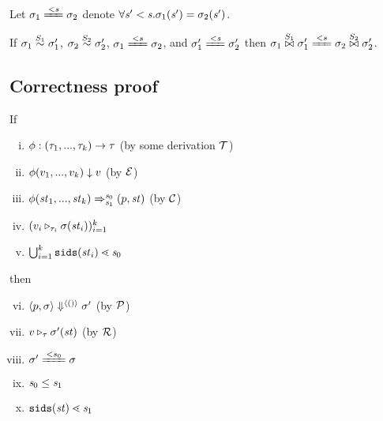 Let $\sgm_1 \ConEq{\s} \sgm_2$ denote $\forall \s' < \s. \sgm_1(\s') = \sgm_2(\s')$. 
	
\begin{lem}\label{lem-join2}
	If $\sgm_1 \~{\S_1} \sgm'_1$, $\sgm_2 \~{\S_2} \sgm'_2$, $\sgm_1 \ConEq{s} \sgm_2$,
	and $\sgm'_1 \ConEq{\s} \sgm_2'$  
	then $\sgm_1 \x{\S_1} \sgm_1' \ConEq{s} \sgm_2 \x{\S_2} \sgm'_2$. 
\end{lem}




\subsection{Correctness proof}

\begin{lem}
	\label{function-correctness}
	If 
	\begin{enumerate}[(i)]
	\item $\Typef{\hcall}{\replc{k}{\tau}}\tau$ (by some derivation $\MT$)
	\item $\EvalF{\hcall}{\replc{k}{v}}{v}$ (by $\ME$)
	\item $\Transf{\hcall}{\replc k {\st}} {\s_0} {\s_1} {\sfun{p}{\st}}$ (by $\MC$)
 	\item $(\ValRep{v_i}{\tau_i}{\sgm(\st_i)})^k_{i=1}$
 	\item $\bigcup^k_{i=1}\sids{\st_i} \.< \s_0$
	\end{enumerate}
 	then 
 	\begin{enumerate}[(i)]
 		\setcounter{enumi}{5}
 		\item $\seval{p}{\sgm}{\vunit}{\sgm'}$ (by $\MP$)
 		\item $\ValRep{v}{\tau}{\sgm'(\st)}$ (by $\MR$)
 		\item $\sgm' \ConEq{s_0} \sgm $
 	    \item $\s_0 \le \s_1$
 		\item $\sids{\st} \.< \s_1$

 	\end{enumerate}
\end{lem}

